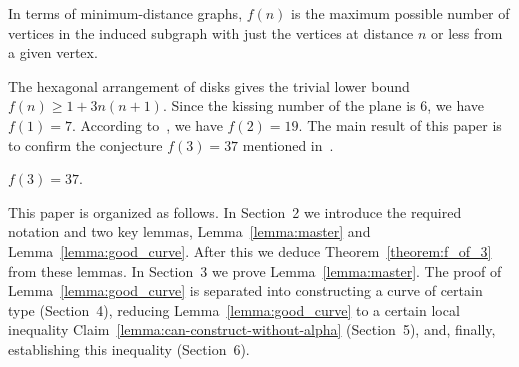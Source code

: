 In terms of minimum-distance graphs, $f(n)$ is the maximum possible number of vertices in the induced subgraph with just the vertices at distance $n$ or less from a given vertex. %

The hexagonal arrangement of disks gives the trivial lower bound $f(n) \geq 1 + {3n(n+1)}.$ Since the kissing number of the plane is $6$, we have $f(1) = 7$. According to~\cite{toth_heppes}, we have $f(2) = 19$. The main result of this paper is to confirm the conjecture $f(3) = 37$ mentioned in~\cite{furedi}.

\begin{theorem}\label{theorem:f_of_3} $f(3) = 37$.
\end{theorem}




This paper is organized as follows. In Section~2 we introduce the required notation and two key lemmas, Lemma~\ref{lemma:master} and Lemma~\ref{lemma:good_curve}. After this we deduce Theorem~\ref{theorem:f_of_3} from these lemmas. In Section~3 we prove Lemma~\ref{lemma:master}. The proof of Lemma~\ref{lemma:good_curve} is separated into constructing a curve of certain type (Section~4), reducing Lemma~\ref{lemma:good_curve} to a certain local inequality Claim~\ref{lemma:can-construct-without-alpha} (Section~5), and, finally, establishing this inequality (Section~6).


